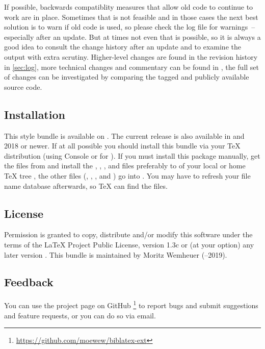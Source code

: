 \documentclass[DIV=9]{scrartcl}
\def\tex{TeX}%
\def\lppl{LaTeX Project Public License}%
\newcommand*{\ctan}{\mkbibacro{CTAN}}
\newcommand*{\gitbaseurl}{https://github.com/moewew/biblatex-ext}
\begin{document}
If possible, backwards compatiblity measures that allow old code to
continue to work are in place. Sometimes that is not feasible and in those
cases the next best solution is to warn if old code is used, so please check
the log file for warnings~-- especially after an update.
But at times not even that is possible, so it is always a good idea to consult
the change history after an update and to examine the output with extra
scrutiny.
Higher-level changes are found in the revision history in \cref{sec:log},
more technical changes and commentary can be found in ,
the full set of changes can be investigated by comparing the tagged and
publicly available source code.

\subsection{Installation}\label{sec:install}
This style bundle is available on \ctan.%
The current release is also available in \miktex{} and \texlive{} 2018 or
newer.
If at all possible you should install this bundle via your \tex{} distribution
(using \miktex{} Console or
 for \texlive
{}).
If you must install this package manually, get the files from \ctan{}
and install the , , ,
 and  files preferably to
 of your local or home \TeX{} tree%
, the other
files (, , ,
 and ) go into
. You may have to refresh your file name database
afterwards, so \tex{} can find the files.

\subsection{License}\label{sec:license}
Permission is granted to copy, distribute and\slash or modify this software
under the terms of the \lppl, version 1.3c%
or (at your option) any later version%
.
This bundle is maintained by Moritz Wemheuer (--2019).


\subsection{Feedback}\label{sec:feedback}
You can use the  project page on GitHub%
\footnote{\url{\gitbaseurl}} to report bugs and
submit suggestions and feature requests, or you can do so via email.
\end{document}
